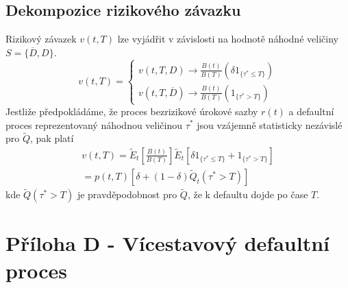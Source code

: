\subsection{Dekompozice rizikového závazku}

Rizikový závazek $v(t,T)$ lze vyjádřit v závislosti na hodnotě náhodné veličiny $S = \{\overline{D}, D\}$.
\begin{equation}
v(t,T) = 
\begin{cases}
v(t, T, D) \rightarrow \frac{B(t)}{B(T)}\left(\delta1_{\{\tau^* \le T\}}\right)\\
v(t, T, \overline{D}) \rightarrow \frac{B(t)}{B(T)}\left(1_{\{\tau^* > T\}}\right)
\end{cases}
\end{equation}
Jestliže předpokládáme, že proces bezrizikové úrokové sazby $r(t)$ a defaultní proces reprezentovaný náhodnou veličinou $\tau^*$ jsou vzájemně statisticky nezávislé pro $\tilde{Q}$, pak platí
\begin{multline}
v(t,T) = \tilde{E}_t \left[\frac{B(t)}{B(T)}\right]\tilde{E}_t \left[\delta 1_{\{\tau^* \le T\}} + 1_{\{\tau^* > T\}} \right]\\
= p(t,T)[\delta + (1 - \delta)\tilde{Q}_t(\tau^* > T)]
\end{multline}
kde $\tilde{Q}(\tau^* > T)$ je pravděpodobnost pro $\tilde{Q}$, že k defaultu dojde po čase $T$.

\section{Příloha D - Vícestavový defaultní proces}

